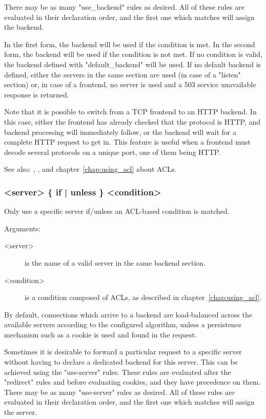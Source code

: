 {  There may be as many "use\_backend" rules as desired. All of these rules are
  evaluated in their declaration order, and the first one which matches will
  assign the backend.

  In the first form, the backend will be used if the condition is met. In the
  second form, the backend will be used if the condition is not met. If no
  condition is valid, the backend defined with "default\_backend" will be used.
  If no default backend is defined, either the servers in the same section are
  used (in case of a "listen" section) or, in case of a frontend, no server is
  used and a 503 service unavailable response is returned.

  Note that it is possible to switch from a TCP frontend to an HTTP backend. In
  this case, either the frontend has already checked that the protocol is HTTP,
  and backend processing will immediately follow, or the backend will wait for
  a complete HTTP request to get in. This feature is useful when a frontend
  must decode several protocols on a unique port, one of them being HTTP.

  See also: , , and chapter~\ref{chap:using_acl} about ACLs.

\subsubsection[use-server]{ <server> \{ if | unless \} <condition>}

  Only use a specific server if/unless an ACL-based condition is matched.


  Arguments:
  \begin{description}
  \item[<server>] is the name of a valid server in the same backend section.
  \item[<condition>] is a condition composed of ACLs, as described in chapter~\ref{chap:using_acl}.
  \end{description}

  By default, connections which arrive to a backend are load-balanced across
  the available servers according to the configured algorithm, unless a
  persistence mechanism such as a cookie is used and found in the request.

  Sometimes it is desirable to forward a particular request to a specific
  server without having to declare a dedicated backend for this server. This
  can be achieved using the "use-server" rules. These rules are evaluated after
  the "redirect" rules and before evaluating cookies, and they have precedence
  on them. There may be as many "use-server" rules as desired. All of these
  rules are evaluated in their declaration order, and the first one which
  matches will assign the server.

}
